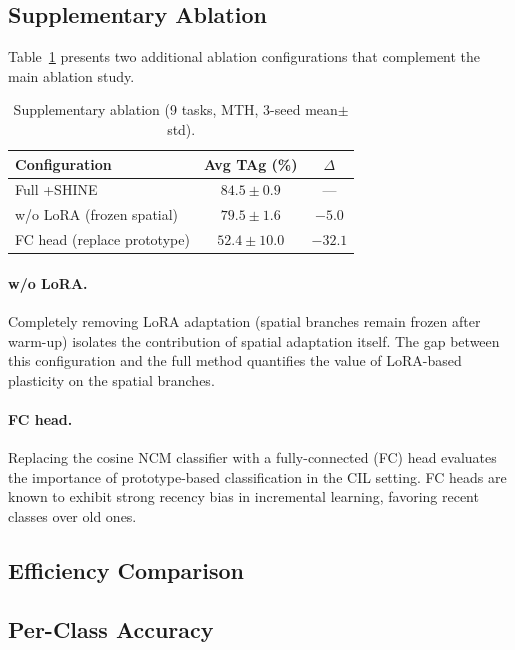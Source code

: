 
\subsection{Supplementary Ablation}
\label{app:supp_ablation}

Table~\ref{tab:supp_ablation} presents two additional ablation configurations that complement the main ablation study.

\begin{table}[h]
\centering
\caption{Supplementary ablation (9 tasks, MTH, 3-seed mean$\pm$std).}
\label{tab:supp_ablation}
\begin{tabular}{lcc}
\toprule
Configuration & Avg TAg (\%) & $\Delta$ \\
\midrule
Full \methodname{}+SHINE & $84.5 \pm 0.9$ & --- \\
\midrule
w/o LoRA (frozen spatial) & $79.5 \pm 1.6$ & $-5.0$ \\
FC head (replace prototype) & $52.4 \pm 10.0$ & $-32.1$ \\
\bottomrule
\end{tabular}
\end{table}

\paragraph{w/o LoRA.}
Completely removing LoRA adaptation (spatial branches remain frozen after warm-up) isolates the contribution of spatial adaptation itself.
The gap between this configuration and the full method quantifies the value of LoRA-based plasticity on the spatial branches.

\paragraph{FC head.}
Replacing the cosine NCM classifier with a fully-connected (FC) head evaluates the importance of prototype-based classification in the CIL setting.
FC heads are known to exhibit strong recency bias in incremental learning, favoring recent classes over old ones.

\subsection{Efficiency Comparison}
\label{app:efficiency}



\subsection{Per-Class Accuracy}
\label{app:perclass}

